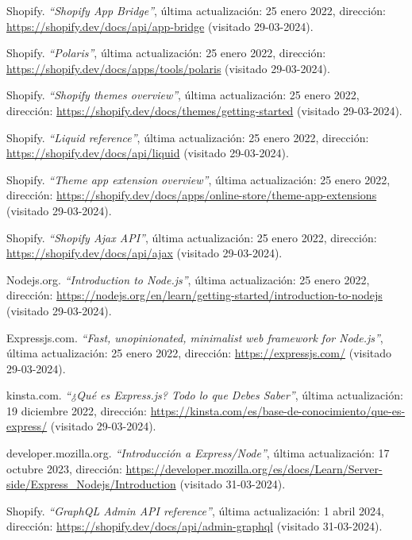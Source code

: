 \documentclass[12pt]{article}
\begin{document}
\begin{thebibliography}{100}
    Shopify.
    \textit{``Shopify App Bridge''}, última actualización: 25 enero 2022, dirección: \url{https://shopify.dev/docs/api/app-bridge} (visitado 29-03-2024).

    Shopify.
    \textit{``Polaris''}, última actualización: 25 enero 2022, dirección: \url{https://shopify.dev/docs/apps/tools/polaris} (visitado 29-03-2024).

    Shopify.
    \textit{``Shopify themes overview''}, última actualización: 25 enero 2022, dirección: \url{https://shopify.dev/docs/themes/getting-started} (visitado 29-03-2024).

    Shopify.
    \textit{``Liquid reference''}, última actualización: 25 enero 2022, dirección: \url{https://shopify.dev/docs/api/liquid} (visitado 29-03-2024).

    Shopify.
    \textit{``Theme app extension overview''}, última actualización: 25 enero 2022, dirección: \url{https://shopify.dev/docs/apps/online-store/theme-app-extensions} (visitado 29-03-2024).

    Shopify.
    \textit{``Shopify Ajax API''}, última actualización: 25 enero 2022, dirección: \url{https://shopify.dev/docs/api/ajax} (visitado 29-03-2024).

    Nodejs.org.
    \textit{``Introduction to Node.js''}, última actualización: 25 enero 2022, dirección: \url{https://nodejs.org/en/learn/getting-started/introduction-to-nodejs} (visitado 29-03-2024).

    Expressjs.com.
    \textit{``Fast, unopinionated, minimalist web framework for Node.js''}, última actualización: 25 enero 2022, dirección: \url{https://expressjs.com/} (visitado 29-03-2024).

    kinsta.com.
    \textit{``¿Qué es Express.js? Todo lo que Debes Saber''}, última actualización: 19 diciembre 2022, dirección: \url{https://kinsta.com/es/base-de-conocimiento/que-es-express/} (visitado 29-03-2024).
    
    developer.mozilla.org.
    \textit{``Introducción a Express/Node''}, última actualización: 17 octubre 2023, dirección: \url{https://developer.mozilla.org/es/docs/Learn/Server-side/Express_Nodejs/Introduction} (visitado 31-03-2024).

    Shopify.
    \textit{``GraphQL Admin API reference''}, última actualización: 1 abril 2024, dirección: \url{https://shopify.dev/docs/api/admin-graphql} (visitado 31-03-2024).


\end{thebibliography}
\end{document}
